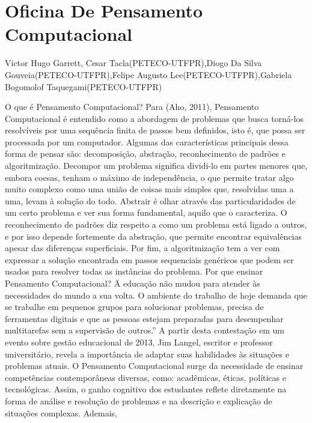 


\section*{Oficina De Pensamento Computacional}

Victor Hugo Garrett, Cesar Tacla(PETECO-UTFPR),Diogo Da Silva Gouveia(PETECO-UTFPR),Felipe Augusto Lee(PETECO-UTFPR),Gabriela Bogomolof Taquegami(PETECO-UTFPR)

O que é Pensamento Computacional?
Para (Aho, 2011), Pensamento Computacional é entendido como a abordagem de
problemas que busca torná-los resolvíveis por uma sequência finita de passos bem definidos, isto
é, que possa ser processada por um computador. Algumas das características principais dessa
forma de pensar são: decomposição, abstração, reconhecimento de padrões e algoritmização.
Decompor um problema significa dividi-lo em partes menores que, embora coesas, tenham o
máximo de independência, o que permite tratar algo muito complexo como uma união de coisas
mais simples que, resolvidas uma a uma, levam à solução do todo. Abstrair é olhar através das
particularidades de um certo problema e ver sua forma fundamental, aquilo que o caracteriza. O
reconhecimento de padrões diz respeito a como um problema está ligado a outros, e por isso
depende fortemente da abstração, que permite encontrar equivalências apesar das diferenças
superficiais. Por fim, a algoritmização tem a ver com expressar a solução encontrada em passos
sequenciais genéricos que podem ser usados para resolver todas as instâncias do problema.
Por que ensinar Pensamento Computacional?
\"A educação não mudou para atender às necessidades do mundo a sua volta. O ambiente
do trabalho de hoje demanda que se trabalhe em pequenos grupos para solucionar problemas,
precisa de ferramentas digitais e que as pessoas estejam preparadas para desempenhar
multitarefas sem a supervisão de outros.” A partir desta contestação em um evento sobre gestão
educacional de 2013, Jim Langel, escritor e professor universitário, revela a importância de
adaptar suas habilidades às situações e problemas atuais. O Pensamento Computacional surge da
necessidade de ensinar competências contemporâneas diversas, como: acadêmicas, éticas,
políticas e tecnológicas. Assim, o ganho cognitivo dos estudantes reflete diretamente na forma de
análise e resolução de problemas e na descrição e explicação de situações complexas. Ademais,
